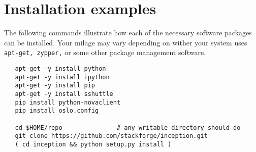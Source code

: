 \section{Installation examples}
The following commands illustrate how each of the necessary software packages can be installed. 
Your milage may vary depending on wither your system uses \verb!apt-get, zypper,! or some other 
package management software.  

\small\begin{verbatim}
   apt-get -y install python
   apt-get -y install ipython 
   apt-get -y install pip
   apt-get -y install sshuttle
   pip install python-novaclient
   pip install oslo.config
 
   cd $HOME/repo               # any writable directory should do
   git clone https://github.com/stackforge/inception.git
   ( cd inception && python setup.py install )
   
\end{verbatim}\normalsize
